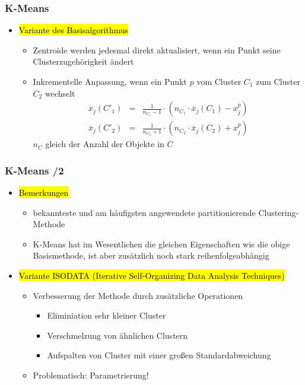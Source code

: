 
\begin{frame}
\frametitle{K-Means}

\begin{itemize}
\item \hl{Variante des Basisalgorithmus}
\begin{itemize}
\item Zentroide werden jedesmal direkt aktualisiert, wenn ein Punkt seine 
Clusterzugehörigkeit ändert 
\item Inkrementelle Anpassung, wenn ein Punkt $p$ vom Cluster $C_1$
  zum Cluster $C_2$ wechselt  
\begin{eqnarray*}
\overline{x}_j(C'_1) &=& \frac{1}{n_{C_1}-1}\cdot (n_{C_1} \cdot
\overline{x}_j(C_1)-x^p_j) \\
\overline{x}_j(C'_2) &=& \frac{1}{n_{C_2}+1}\cdot 
(n_{C_2} \cdot \overline{x}_j(C_2)+x^p_j) 
\end{eqnarray*}
$n_C$ gleich der Anzahl der Objekte in $C$
\end{itemize} 
\end{itemize}

\end{frame}


\begin{frame}
\frametitle{K-Means /2}

\begin{itemize}
\item \hl{Bemerkungen}
\begin{itemize}
\item bekannteste und am häufigsten angewendete partitionierende
  Clustering-Methode  
\item K-Means hat im Wesentlichen die gleichen Eigenschaften wie die
  obige Basismethode, ist aber zusätzlich noch stark
  reihenfolgeabhängig 
\end{itemize}
\item\hl{Variante ISODATA (Iterative Self-Organizing Data Analysis Techniques)}
\begin{itemize}
\item Verbesserung der Methode durch zusätzliche Operationen 
\begin{itemize}
\item Eliminiation sehr kleiner Cluster 
\item Verschmelzung von ähnlichen Clustern
\item Aufspalten von Cluster mit einer großen Standardabweichung
\end{itemize}
\item Problematisch: Parametrierung! 
\end{itemize}
\end{itemize}

\end{frame}


